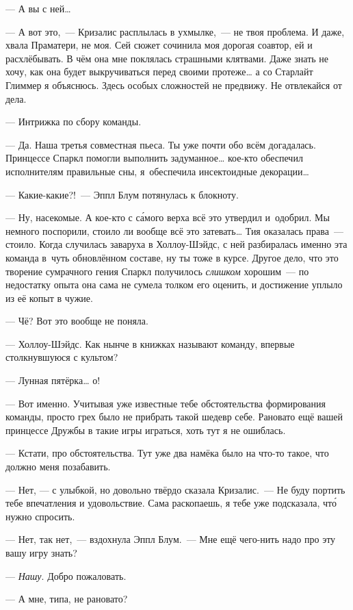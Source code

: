 \documentclass[fontsize=11pt,a5paper,titlepage=firstcover]{scrbook}
\begin{document}
--- А вы с ней{\ldots}

--- А вот это,~--- Кризалис расплылась в ухмылке,~--- не твоя проблема. И даже, хвала Праматери, не моя. Сей сюжет сочинила моя дорогая соавтор, ей и расхлёбывать. В чём она мне поклялась страшными клятвами. Даже знать не хочу, как она будет выкручиваться перед своими протеже{\ldots} а со Старлайт Глиммер я объяснюсь. Здесь особых сложностей не предвижу. Не отвлекайся от дела.

--- Интрижка по сбору команды.

--- Да. Наша третья совместная пьеса. Ты уже почти обо всём догадалась. Принцессе Спаркл помогли выполнить задуманное{\ldots} кое-кто обеспечил исполнителям правильные сны, я~обеспечила инсектоидные декорации{\ldots}

--- Какие-какие?!~--- Эппл Блум потянулась к блокноту.

--- Ну, насекомые. А кое-кто с са́мого верха всё это утвердил и~одобрил. Мы немного поспорили, стоило ли вообще всё это затевать{\ldots} Тия оказалась права~--- стоило. Когда случилась заваруха в Холлоу-Шэйдс, с ней разбиралась именно эта команда в~чуть обновлённом составе, ну ты тоже в курсе. Другое дело, что это творение сумрачного гения Спаркл получилось \emph{слишком} хорошим~--- по недостатку опыта она сама не сумела толком его оценить, и достижение уплыло из её копыт в чужие.

--- Чё? Вот это вообще не поняла.

--- Холлоу-Шэйдс. Как нынче в книжках называют команду, впервые столкнувшуюся с культом?

--- Лунная пятёрка{\ldots} о!

--- Вот именно. Учитывая уже известные тебе обстоятельства формирования команды, просто грех было не прибрать такой шедевр себе. Рановато ещё вашей принцессе Дружбы в такие игры играться, хоть тут я не ошиблась.

--- Кстати, про обстоятельства. Тут уже два намёка было на что-то такое, что должно меня позабавить.

--- Нет, --- с улыбкой, но довольно твёрдо сказала Кризалис.~--- Не буду портить тебе впечатления и удовольствие. Сама раскопаешь, я тебе уже подсказала, что́ нужно спросить.

--- Нет, так нет,~--- вздохнула Эппл Блум.~--- Мне ещё чего-нить надо про эту вашу игру знать?

--- \emph{Нашу}. Добро пожаловать.

--- А мне, типа, не рановато?
\end{document}

